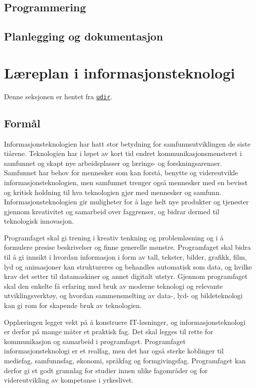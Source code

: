 \documentclass[%
oneside,                 %
final,                   %
12pt]{article}
\begin{document}
\subsection{Programmering}
\label{section:teori:programmering}

\subsection{Planlegging og dokumentasjon}
\label{section:teori:planlegging}


\section{Læreplan i informasjonsteknologi}

Denne seksjonen er hentet fra \href{{http://www.udir.no/kl06/inf1-01/Hele}}{\nolinkurl{udir}}.

\subsection{Formål}

Informasjonsteknologien har hatt stor betydning for
samfunnsutviklingen de siste tiårene. Teknologien har i løpet av kort
tid endret kommunikasjonsmønsteret i samfunnet og skapt nye
arbeidsplasser og lærings- og forskningsarenaer. Samfunnet har behov
for mennesker som kan forstå, benytte og videreutvikle
informasjonsteknologien, men samfunnet trenger også mennesker med en
bevisst og kritisk holdning til hva teknologien gjør med mennesker og
samfunn. Informasjonsteknologien gir muligheter for å lage helt nye
produkter og tjenester gjennom kreativitet og samarbeid over
faggrenser, og bidrar dermed til teknologisk innovasjon.

Programfaget skal gi trening i kreativ tenkning og problemløsning og
i å formulere presise beskrivelser og finne generelle
mønstre. Programfaget skal bidra til å gi innsikt i hvordan
informasjon i form av tall, tekster, bilder, grafikk, film, lyd og
animasjoner kan struktureres og behandles automatisk som data, og
hvilke krav det setter til datamaskiner og annet digitalt
utstyr. Gjennom programfaget skal den enkelte få erfaring med bruk av
moderne teknologi og relevante utviklingsverktøy, og hvordan
sammensmelting av data-, lyd- og bildeteknologi kan gi rom for
skapende bruk av teknologien.

Opplæringen legger vekt på å konstruere IT-løsninger, og
informasjonsteknologi er derfor på mange måter et praktisk fag. Det
skal legges til rette for kommunikasjon og samarbeid i
programfaget. Programfaget informasjonsteknologi er et realfag, men
det har også sterke koblinger til mediefag, samfunnsfag, økonomi,
språkfag og formgivingsfag. Programfaget kan derfor gi et godt
grunnlag for studier innen ulike fagområder og for videreutvikling av
kompetanse i yrkeslivet.
\end{document}
